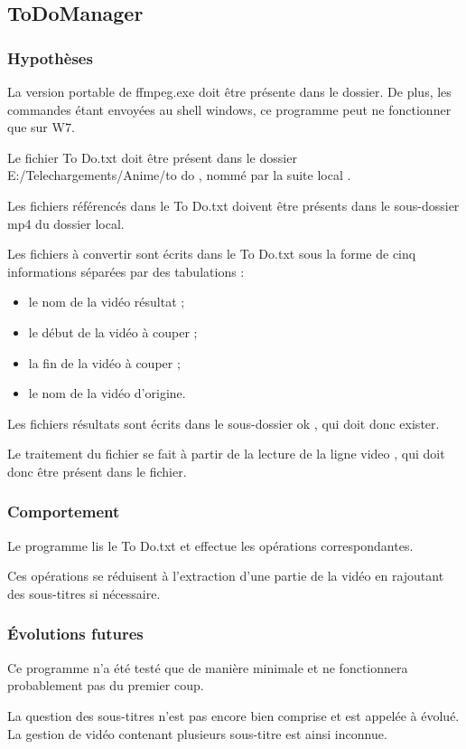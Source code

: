 \documentclass[a4paper,12pt]{article}
\begin{document}
\subsection{ToDoManager}
\subsubsection{Hypothèses}
La version portable de ffmpeg.exe doit être présente dans le dossier. De plus, les commandes étant envoyées au shell windows, ce programme peut ne fonctionner que sur W7.

Le fichier \og To Do.txt \fg{} doit être présent dans le dossier \og E:/Telechargements/Anime/to do \fg, nommé par la suite \og local \fg.

Les fichiers référencés dans le To Do.txt doivent être présents dans le sous-dossier \og mp4 \fg{} du dossier local.

Les fichiers à convertir sont écrits dans le To Do.txt sous la forme de cinq informations séparées par des tabulations :
\begin{itemize}
\item le nom de la vidéo résultat ;
\item le début de la vidéo à couper ;
\item la fin de la vidéo à couper ;
\item le nom de la vidéo d'origine.
\end{itemize}

Les fichiers résultats sont écrits dans le sous-dossier \og ok \fg, qui doit donc exister.

Le traitement du fichier se fait à partir de la lecture de la ligne \og video \fg, qui doit donc être présent dans le fichier.
\subsubsection{Comportement}
Le programme lis le To Do.txt et effectue les opérations correspondantes. 

Ces opérations se réduisent à l'extraction d'une partie de la vidéo en rajoutant des sous-titres si nécessaire.
\subsubsection{Évolutions futures}
Ce programme n'a été testé que de manière minimale et ne fonctionnera probablement pas du premier coup. 

La question des sous-titres n'est pas encore bien comprise et est appelée à évolué. La gestion de vidéo contenant plusieurs sous-titre est ainsi inconnue. 
\end{document}
